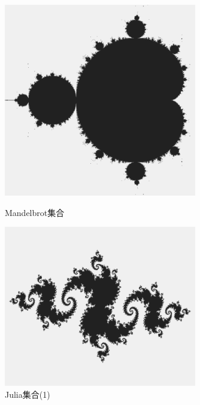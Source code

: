 \documentclass[dvipdfmx]{jsarticle}
\theoremstyle{definition}
\begin{document}
\begin{figure}[H]
    \begin{minipage}{0.49\hsize}
        \centering
        \includegraphics[width=0.75\textwidth]{figure/others/set/mandelbrot_set.png}
        \caption{Mandelbrot集合}
        \label{pic_mbset}
    \end{minipage}
    \begin{minipage}{0.49\hsize}
        \centering
        \includegraphics[width=0.75\textwidth]{figure/others/set/julia_set.png}
        \caption{Julia集合(1)}
    \end{minipage}
\end{figure}
\end{document}
